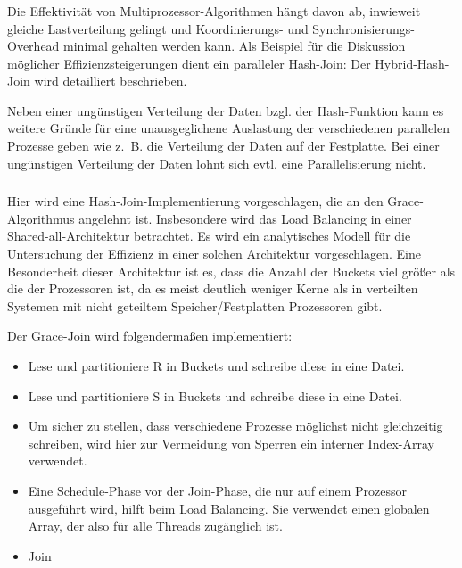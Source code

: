 \documentclass[a4paper,12pt,twoside]{article}
\begin{document}
\subsubsection*{}

Die Effektivität von Multiprozessor-Algorithmen hängt davon ab, inwieweit gleiche Lastverteilung gelingt und Koordinierungs- und Synchronisierungs-Overhead minimal gehalten werden kann. Als Beispiel für die Diskussion möglicher Effizienzsteigerungen dient ein paralleler Hash-Join: Der Hybrid-Hash-Join wird detailliert beschrieben.

Neben einer ungünstigen Verteilung der Daten bzgl. der Hash-Funktion kann es weitere Gründe für eine unausgeglichene Auslastung der verschiedenen parallelen Prozesse geben wie z.~B. die Verteilung der Daten auf der Festplatte. Bei einer ungünstigen Verteilung der Daten lohnt sich evtl. eine Parallelisierung nicht.  

\subsubsection*{}

Hier wird eine Hash-Join-Implementierung vorgeschlagen, die an den Grace-Algorithmus angelehnt ist. Insbesondere wird das Load Balancing in einer Shared-all-Architektur betrachtet. Es wird ein analytisches Modell für die Untersuchung der Effizienz in einer solchen Architektur vorgeschlagen. Eine Besonderheit dieser Architektur ist es, dass die Anzahl der Buckets viel größer als die der Prozessoren ist, da es meist deutlich weniger Kerne als in verteilten Systemen mit nicht geteiltem Speicher/Festplatten Prozessoren gibt. 

Der Grace-Join wird folgendermaßen implementiert:

\begin{itemize}
	\item Lese und partitioniere R in Buckets und schreibe diese in eine Datei.
	\item Lese und partitioniere S in Buckets und schreibe diese in eine Datei.
	\item Um sicher zu stellen, dass verschiedene Prozesse möglichst nicht gleichzeitig schreiben, wird hier zur Vermeidung von Sperren ein interner Index-Array verwendet.
	\item Eine Schedule-Phase vor der Join-Phase, die nur auf einem Prozessor ausgeführt wird, hilft beim Load Balancing. Sie verwendet einen globalen Array, der also für alle Threads zugänglich ist.
	\item Join
\end{itemize}
\end{document}
